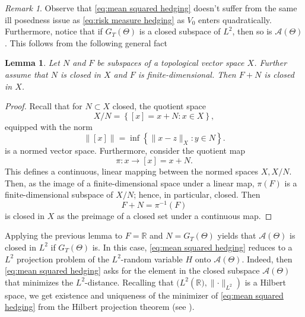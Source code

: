 \documentclass[11pt,a4paper,twoside,openany]{report}
\theoremstyle{plain} %
\newtheorem{lemma}[lemma]{Lemma}
\theoremstyle{definition} %
\theoremstyle{remark} %
\newtheorem{remark}[remark]{Remark}
\let\parencite\authnumparencite
\begin{document}
\begin{remark}\label{rem:if G_T closed then mean variance hedging is projection onto closed hilbert subspace}
    Observe that \cref{eq:mean squared hedging} doesn't suffer from the same ill posedness issue as \cref{eq:risk measure hedging} as \(V_0\) enters quadratically.
Furthermore, notice that if \(G_T(\Theta)\) is a closed subspace of \(L^2\), then so is \(\mathcal{A}(\Theta)\). This follows from the following general fact
\begin{lemma}
    Let \(N\) and \(F\) be subspaces of a topological vector space \(X\). Further assume that \(N\) is closed in \(X\) and \(F\) is finite-dimensional. Then \(F+N\) is closed in \(X\).
\end{lemma}
\begin{proof}
    Recall that for \(N\subset X\) closed, the quotient space 
    \begin{equation*}
        X/N=\left\{[x]=x+N:x\in X\right\},
    \end{equation*}
   equipped with the norm
    \begin{equation*}
        \lVert [x]\rVert = \inf \left\{\lVert x-z\rVert_X:y\in N\right\}.
    \end{equation*}
    is a normed vector space. Furthermore, consider the quotient map
    \begin{equation*}
        \pi:x\to[x]=x+N.
    \end{equation*}
 This defines a continuous, linear mapping between the normed spaces \(X,X/N\).
    Then, as the image of a finite-dimensional space under a linear map, \(\pi(F)\) is a finite-dimensional subspace of \(X/N\); hence, in particular, closed. Then 
    \begin{equation*}
        F+N=\pi^{-1}(F)
    \end{equation*}
    is closed in \(X\) as the preimage of a closed set under a continuous map.  
\end{proof}
Applying the previous lemma to \(F=\mathbb{R}\) and \(N=G_T(\Theta)\) yields that \(\mathcal{A}(\Theta)\) is closed in \(L^2\) if \(G_T(\Theta)\) is. In this case, \cref{eq:mean squared hedging} reduces to a \(L^2\) projection problem of the \(L^2\)-random variable \(H\) onto \(\mathcal{A}(\Theta)\). 
Indeed, then \cref{eq:mean squared hedging} asks for the element in the closed subspace \(\mathcal{A}(\Theta)\) that minimizes the \(L^2\)-distance. Recalling that \((L^2(\mathbb{R)},\lVert\cdot\rVert_{L^2})\) is a Hilbert space, we get existence and uniqueness of the minimizer of \cref{eq:mean squared hedging} from the Hilbert projection theorem (see \parencite[Thm.~12.3]{Rudin1991FunctionalAnalysis}). 
\end{remark}
\end{document}
